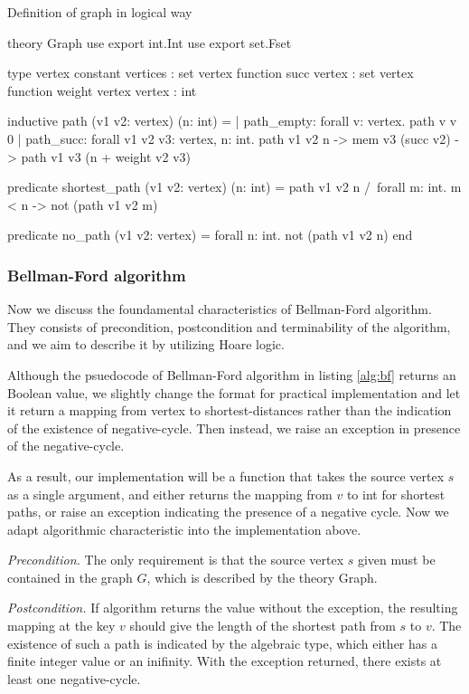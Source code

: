 \documentclass[a4paper,12pt]{article}
\begin{document}
\begin{algorithm}
\caption{Definition of graph in logical way}\label{lst:graph}
\begin{why3}[1]
theory Graph
  use export int.Int
  use export set.Fset

  type vertex
  constant vertices : set vertex
  function succ vertex : set vertex
  function weight vertex vertex : int

  inductive path (v1 v2: vertex) (n: int) =
    | path_empty:
        forall v: vertex. path v v 0
    | path_succ:
        forall v1 v2 v3: vertex, n: int.
        path v1 v2 n -> mem v3 (succ v2) -> path v1 v3 (n + weight v2 v3)

  predicate shortest_path (v1 v2: vertex) (n: int) =
    path v1 v2 n /\
    forall m: int. m < n -> not (path v1 v2 m)

  predicate no_path (v1 v2: vertex) =
    forall n: int. not (path v1 v2 n)
end
\end{why3}
\end{algorithm}

\subsubsection{Bellman-Ford algorithm}

Now we discuss the foundamental characteristics of Bellman-Ford algorithm. They consists of precondition, postcondition and terminability of the algorithm, and we aim to describe it by utilizing Hoare logic.

Although the psuedocode of Bellman-Ford algorithm in listing \ref{alg:bf} returns an Boolean value, we slightly change the format for practical implementation and let it return a mapping from vertex to shortest-distances rather than the indication of the existence of negative-cycle. Then instead, we raise an exception in presence of the negative-cycle.

As a result, our implementation will be a function that takes the source vertex $ s $ as a single argument, and either returns the mapping from $ v $ to \mbox{\sc int} for shortest paths, or raise an exception indicating the presence of a negative cycle. Now we adapt algorithmic characteristic into the implementation above.

\emph{Precondition.} The only requirement is that the source vertex $ s $ given must be contained in the graph $ G $, which is described by the theory \mbox{\sc Graph}.

\emph{Postcondition.} If algorithm returns the value without the exception, the resulting mapping at the key $ v $ should give the length of the shortest path from $ s $ to $ v $. The existence of such a path is indicated by the algebraic type, which either has a finite integer value or an inifinity. With the exception returned, there exists at least one negative-cycle.
\end{document}
